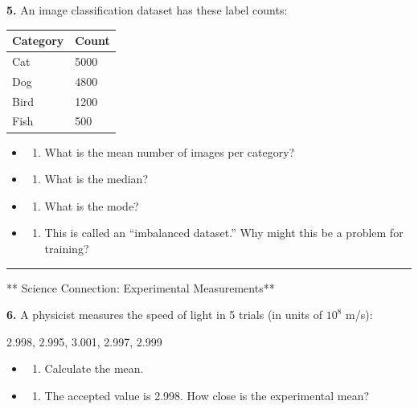 \documentclass[
  11pt,
]{article}
\providecommand{\tightlist}{%
  \setlength{\itemsep}{0pt}\setlength{\parskip}{0pt}}
\begin{document}
\textbf{5.} An image classification dataset has these label counts:

\begin{longtable}[]{@{}ll@{}}
\toprule\noalign{}
Category & Count \\
\midrule\noalign{}
\endhead
\bottomrule\noalign{}
\endlastfoot
Cat & 5000 \\
Dog & 4800 \\
Bird & 1200 \\
Fish & 500 \\
\end{longtable}

\begin{itemize}
\item
  \begin{enumerate}
  \def\labelenumi{(\alph{enumi})}
  \tightlist
  \item
    What is the mean number of images per category?
  \end{enumerate}
\item
  \begin{enumerate}
  \def\labelenumi{(\alph{enumi})}
  \setcounter{enumi}{1}
  \tightlist
  \item
    What is the median?
  \end{enumerate}
\item
  \begin{enumerate}
  \def\labelenumi{(\alph{enumi})}
  \setcounter{enumi}{2}
  \tightlist
  \item
    What is the mode?
  \end{enumerate}
\item
  \begin{enumerate}
  \def\labelenumi{(\alph{enumi})}
  \setcounter{enumi}{3}
  \tightlist
  \item
    This is called an ``imbalanced dataset.'' Why might this be a
    problem for training?
  \end{enumerate}
\end{itemize}

\begin{center}\rule{0.5\linewidth}{0.5pt}\end{center}

** Science Connection: Experimental Measurements**

\textbf{6.} A physicist measures the speed of light in 5 trials (in
units of \(10^8\) m/s):

2.998, 2.995, 3.001, 2.997, 2.999

\begin{itemize}
\item
  \begin{enumerate}
  \def\labelenumi{(\alph{enumi})}
  \tightlist
  \item
    Calculate the mean.
  \end{enumerate}
\item
  \begin{enumerate}
  \def\labelenumi{(\alph{enumi})}
  \setcounter{enumi}{1}
  \tightlist
  \item
    The accepted value is 2.998. How close is the experimental mean?
  \end{enumerate}
\end{itemize}
\end{document}
